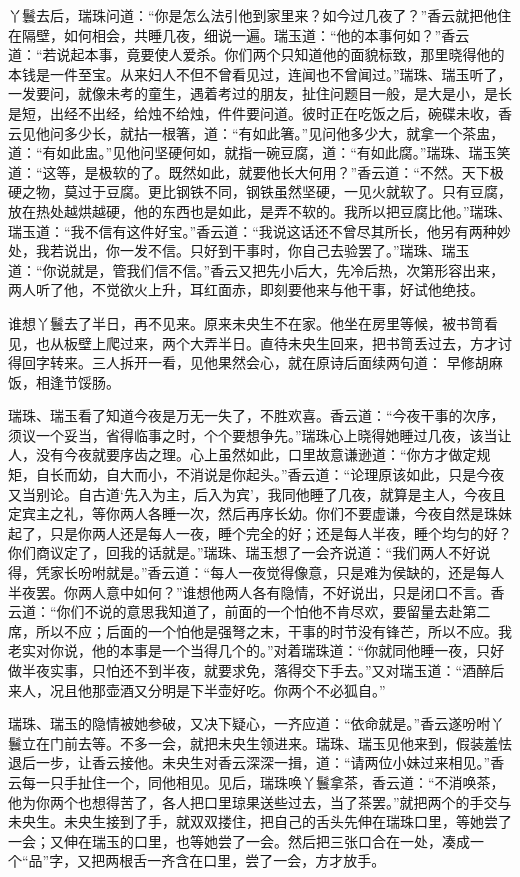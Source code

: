 \documentclass[a4paper,12pt,UTF8,twoside]{ctexbook}
\begin{document}
丫鬟去后，瑞珠问道：“你是怎么法引他到家里来？如今过几夜了？”香云就把他住在隔壁，如何相会，共睡几夜，细说一遍。瑞玉道：“他的本事何如？”香云道：“若说起本事，竟要使人爱杀。你们两个只知道他的面貌标致，那里晓得他的本钱是一件至宝。从来妇人不但不曾看见过，连闻也不曾闻过。”瑞珠、瑞玉听了，一发要问，就像未考的童生，遇着考过的朋友，扯住问题目一般，是大是小，是长是短，出经不出经，给烛不给烛，件件要问道。彼时正在吃饭之后，碗碟未收，香云见他问多少长，就拈一根箸，道：“有如此箸。”见问他多少大，就拿一个茶盅，道：“有如此盅。”见他问坚硬何如，就指一碗豆腐，道：“有如此腐。”瑞珠、瑞玉笑道：“这等，是极软的了。既然如此，就要他长大何用？”香云道：“不然。天下极硬之物，莫过于豆腐。更比钢铁不同，钢铁虽然坚硬，一见火就软了。只有豆腐，放在热处越烘越硬，他的东西也是如此，是弄不软的。我所以把豆腐比他。”瑞珠、瑞玉道：“我不信有这件好宝。”香云道：“我说这话还不曾尽其所长，他另有两种妙处，我若说出，你一发不信。只好到干事时，你自己去验罢了。”瑞珠、瑞玉道：“你说就是，管我们信不信。”香云又把先小后大，先冷后热，次第形容出来，两人听了他，不觉欲火上升，耳红面赤，即刻要他来与他干事，好试他绝技。

谁想丫鬟去了半日，再不见来。原来未央生不在家。他坐在房里等候，被书笥看见，也从板壁上爬过来，两个大弄半日。直待未央生回来，把书笥丢过去，方才讨得回字转来。三人拆开一看，见他果然会心，就在原诗后面续两句道：
早修胡麻饭，相逢节馁肠。

瑞珠、瑞玉看了知道今夜是万无一失了，不胜欢喜。香云道：“今夜干事的次序，须议一个妥当，省得临事之时，个个要想争先。”瑞珠心上晓得她睡过几夜，该当让人，没有今夜就要序齿之理。心上虽然如此，口里故意谦逊道：“你方才做定规矩，自长而幼，自大而小，不消说是你起头。”香云道：“论理原该如此，只是今夜又当别论。自古道‘先入为主，后入为宾’，我同他睡了几夜，就算是主人，今夜且定宾主之礼，等你两人各睡一次，然后再序长幼。你们不要虚谦，今夜自然是珠妹起了，只是你两人还是每人一夜，睡个完全的好；还是每人半夜，睡个均匀的好？你们商议定了，回我的话就是。”瑞珠、瑞玉想了一会齐说道：“我们两人不好说得，凭家长吩咐就是。”香云道：“每人一夜觉得像意，只是难为侯缺的，还是每人半夜罢。你两人意中如何？”谁想他两人各有隐情，不好说出，只是闭口不言。香云道：“你们不说的意思我知道了，前面的一个怕他不肯尽欢，要留量去赴第二席，所以不应；后面的一个怕他是强弩之末，干事的时节没有锋芒，所以不应。我老实对你说，他的本事是一个当得几个的。”对着瑞珠道：“你就同他睡一夜，只好做半夜实事，只怕还不到半夜，就要求免，落得交下手去。”又对瑞玉道：“酒醉后来人，况且他那壶酒又分明是下半壶好吃。你两个不必狐自。”

瑞珠、瑞玉的隐情被她参破，又决下疑心，一齐应道：“依命就是。”香云遂吩咐丫鬟立在门前去等。不多一会，就把未央生领进来。瑞珠、瑞玉见他来到，假装羞怯退后一步，让香云接他。未央生对香云深深一揖，道：“请两位小妹过来相见。”香云每一只手扯住一个，同他相见。见后，瑞珠唤丫鬟拿茶，香云道：“不消唤茶，他为你两个也想得苦了，各人把口里琼果送些过去，当了茶罢。”就把两个的手交与未央生。未央生接到了手，就双双搂住，把自己的舌头先伸在瑞珠口里，等她尝了一会；又伸在瑞玉的口里，也等她尝了一会。然后把三张口合在一处，凑成一个“品”字，又把两根舌一齐含在口里，尝了一会，方才放手。
\end{document}
